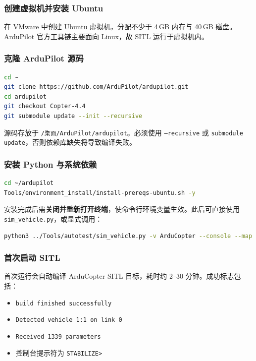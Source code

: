 \documentclass[12pt,a4paper]{article}
\begin{document}
\subsubsection{创建虚拟机并安装 Ubuntu}

在 VMware 中创建 Ubuntu 虚拟机，分配不少于 4\,GB 内存与 40\,GB 磁盘。ArduPilot 官方工具链主要面向 Linux，故 SITL 运行于虚拟机内。

\subsubsection{克隆 ArduPilot 源码}

\begin{lstlisting}[language=bash]
cd ~
git clone https://github.com/ArduPilot/ardupilot.git
cd ardupilot
git checkout Copter-4.4
git submodule update --init --recursive
\end{lstlisting}

源码存放于 \texttt{\~/桌面/ArduPilot/ardupilot}。必须使用 \texttt{--recursive} 或 \texttt{submodule update}，否则依赖库缺失将导致编译失败。

\subsubsection{安装 Python 与系统依赖}

\begin{lstlisting}[language=bash]
cd ~/ardupilot
Tools/environment_install/install-prereqs-ubuntu.sh -y
\end{lstlisting}

安装完成后需\textbf{关闭并重新打开终端}，使命令行环境变量生效。此后可直接使用 \texttt{sim\_vehicle.py}，或显式调用：
\begin{lstlisting}[language=bash]
python3 ../Tools/autotest/sim_vehicle.py -v ArduCopter --console --map
\end{lstlisting}

\subsubsection{首次启动 SITL}

首次运行会自动编译 ArduCopter SITL 目标，耗时约 2--30 分钟。成功标志包括：
\begin{itemize}[leftmargin=2em]
    \item \texttt{build finished successfully}
    \item \texttt{Detected vehicle 1:1 on link 0}
    \item \texttt{Received 1339 parameters}
    \item 控制台提示符为 \texttt{STABILIZE>}
\end{itemize}
\end{document}
